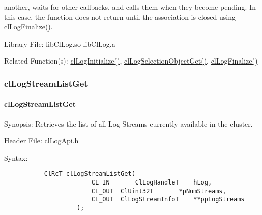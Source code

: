 \begin{flushleft}
\begin{Desc}
another,
 waits for other callbacks, and calls them when they become pending. In this case, the function does not return until the association is 
closed using clLogFinalize().
\end{Desc}
\begin{Desc}
\item[Library File:] libClLog.so
\newline
libClLog.a\end{Desc}
\begin{Desc}
\item[Related Function(s):]\hyperlink{pagelog101}{clLogInitialize()}, \hyperlink{pagelog103}{clLogSelectionObjectGet()}, 
\hyperlink{pagelog102}{clLogFinalize()}\end{Desc}
\newpage




\subsubsection{clLogStreamListGet}
\hypertarget{pagelog105}{}\paragraph{cl\-Log\-Stream\-List\-Get}\label{pagelog105}
\begin{Desc}
\item[Synopsis:] Retrieves the list of all Log Streams currently available in the cluster.\end{Desc}
\begin{Desc}
\item[Header File:] clLogApi.h \end{Desc}
\begin{Desc}
\item[Syntax:]
\footnotesize\begin{verbatim}        	ClRcT clLogStreamListGet(
						CL_IN		ClLogHandleT	hLog,
						CL_OUT	ClUint32T		*pNumStreams,
						CL_OUT	ClLogStreamInfoT	**ppLogStreams
					);


\end{verbatim}
\end{Desc}
\end{flushleft}
